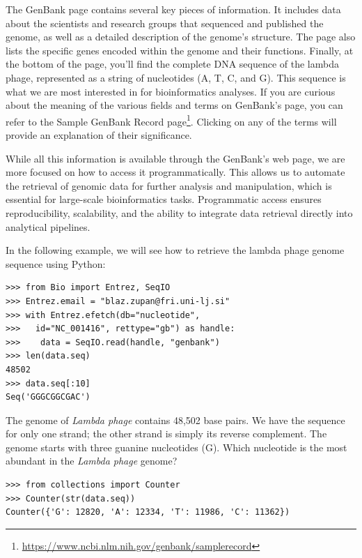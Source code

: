 The GenBank page
contains several key pieces of information.
It includes data about the scientists and research groups that sequenced and published the genome, as well as a detailed description of the genome’s structure. The page also lists the specific genes encoded within the genome and their functions. Finally, at the bottom of the page, you'll find the complete DNA sequence of the lambda phage, represented as a string of nucleotides (A, T, C, and G). This sequence is what we are most interested in for bioinformatics analyses. If you are curious about the meaning of the various fields and terms on GenBank's page, you can refer to the Sample GenBank Record page\footnote{\url{https://www.ncbi.nlm.nih.gov/genbank/samplerecord}}. Clicking on any of the terms will provide an explanation of their significance.

While all this information is available through the GenBank's web page, we are more focused on how to access it programmatically. This allows us to automate the retrieval of genomic data for further analysis and manipulation, which is essential for large-scale bioinformatics tasks. Programmatic access ensures reproducibility, scalability, and the ability to integrate data retrieval directly into analytical pipelines. 

In the following example, we will see how to retrieve the lambda phage genome sequence using Python:

\vspace*{3mm}
\begin{lstlisting}
>>> from Bio import Entrez, SeqIO
>>> Entrez.email = "blaz.zupan@fri.uni-lj.si"
>>> with Entrez.efetch(db="nucleotide", 
>>>   id="NC_001416", rettype="gb") as handle:
>>>    data = SeqIO.read(handle, "genbank")
>>> len(data.seq)
48502
>>> data.seq[:10]
Seq('GGGCGGCGAC')
\end{lstlisting}

The genome of {\em Lambda phage} contains 48,502 base pairs. We have the sequence for only one strand; the other strand is simply its reverse complement. The genome starts with three guanine nucleotides (G). Which nucleotide is the most abundant in the {\em Lambda phage} genome?

\vspace*{3mm}
\begin{lstlisting}
>>> from collections import Counter
>>> Counter(str(data.seq))
Counter({'G': 12820, 'A': 12334, 'T': 11986, 'C': 11362})
\end{lstlisting}

